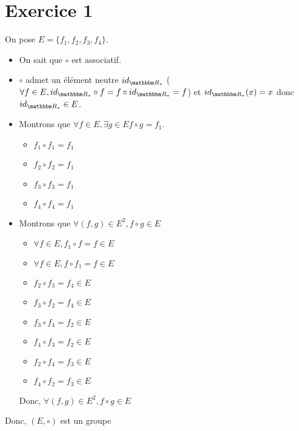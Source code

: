 \part{Exercice 1}

On pose $E = \{f_1, f_2, f_3, f_4\}$.

\begin{itemize}
	\item On sait que $\circ$ est associatif.
	\item $\circ$ admet un élément neutre $id_{\R_*}$ ($\forall f \in E, id_{\R_*} \circ f = f \circ id_{\R_*} = f$) et $id_{\R_*}(x) = x$ donc $id_{\R_*} \in E$.
	\item Montrons que $\forall f \in E, \exists g \in E f \circ g = f_1$.
		\begin{itemize}
			\item $f_1\circ f_1 = f_1$
			\item $f_2\circ f_2 = f_1$
			\item $f_3\circ f_3 = f_1$
			\item $f_4\circ f_4 = f_1$
		\end{itemize}
	\item Montrons que $\forall (f,g) \in E^2, f\circ g \in E$
		\begin{itemize}
			\item $\forall f \in E, f_1 \circ f = f \in E$
			\item $\forall f \in E, f \circ f_1 = f \in E$
			\item $f_2\circ f_3 = f_4 \in E$
			\item $f_3\circ f_2 = f_4 \in E$
			\item $f_3\circ f_4 = f_2 \in E$
			\item $f_4\circ f_3 = f_2 \in E$
			\item $f_2\circ f_4 = f_3 \in E$
			\item $f_4\circ f_2 = f_3 \in E$
		\end{itemize}
		Donc, $\forall (f,g) \in E^2, f\circ g \in E$
\end{itemize}

Donc, $(E, \circ)$ est un groupe
